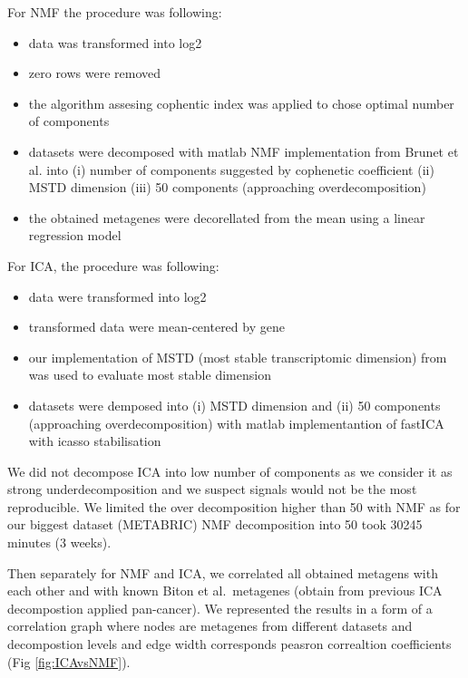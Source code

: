 \documentclass[12pt,]{book}
\providecommand{\tightlist}{%
  \setlength{\itemsep}{0pt}\setlength{\parskip}{0pt}}
\theoremstyle{definition}
\theoremstyle{definition}
\theoremstyle{definition}
\theoremstyle{remark}
\begin{document}
For NMF the procedure was following:

\begin{itemize}
\tightlist
\item
  data was transformed into log2
\item
  zero rows were removed
\item
  the algorithm assesing cophentic index was applied to chose optimal
  number of components
\item
  datasets were decomposed with matlab NMF implementation from Brunet et
  al. \citep{Brunet} into (i) number of components suggested by
  cophenetic coefficient (ii) MSTD dimension (iii) 50 components
  (approaching overdecomposition)
\item
  the obtained metagenes were decorellated from the mean using a linear
  regression model
\end{itemize}

For ICA, the procedure was following:

\begin{itemize}
\tightlist
\item
  data were transformed into log2
\item
  transformed data were mean-centered by gene
\item
  our implementation of MSTD (most stable transcriptomic dimension) from
  \citep{Ulykbek2017} was used to evaluate most stable dimension
\item
  datasets were demposed into (i) MSTD dimension and (ii) 50 components
  (approaching overdecomposition) with matlab implementantion of fastICA
  with icasso stabilisation
\end{itemize}

We did not decompose ICA into low number of components as we consider it
as strong underdecomposition and we suspect signals would not be the
most reproducible. We limited the over decomposition higher than 50 with
NMF as for our biggest dataset (METABRIC) NMF decomposition into 50 took
30245 minutes (3 weeks).

Then separately for NMF and ICA, we correlated all obtained metagens
with each other and with known Biton et al.~metagenes (obtain from
previous ICA decompostion applied pan-cancer). We represented the
results in a form of a correlation graph where nodes are metagenes from
different datasets and decompostion levels and edge width corresponds
peasron correaltion coefficients (Fig \ref{fig:ICAvsNMF}).
\end{document}
